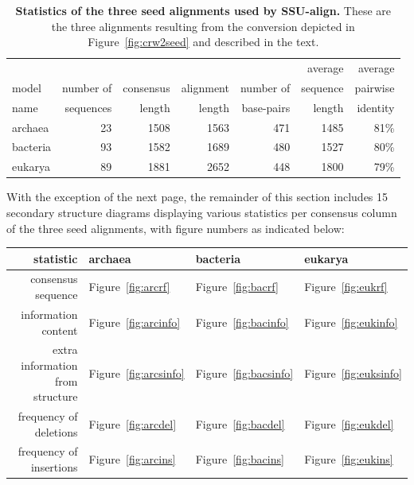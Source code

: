 \begin{table}
\begin{center}
\begin{tabular}{lrrrrrr} \hline
        &           &           &           &           & average   & average  \\
model   & number of & consensus & alignment & number of & sequence  & pairwise \\
name    & sequences & length    & length    & base-pairs & length    & identity \\ \hline
archaea & 23        & 1508      & 1563      & 471       & 1485      & 81\%     \\
bacteria& 93        & 1582      & 1689      & 480       & 1527      & 80\%     \\
eukarya  & 89       & 1881      & 2652      & 448       & 1800      & 79\%     \\ 
\end{tabular}
\caption[Statistics of the three seed alignments used by SSU-align.]
{\textbf{Statistics of the three seed alignments used by
    SSU-align.} These are the three alignments resulting from the
     conversion depicted in Figure~\ref{fig:crw2seed} and
    described in the text.}
\label{tbl:finalseeds}
\end{center}
\end{table}

With the exception of the next page, the remainder of this section
includes 15 secondary structure diagrams displaying various statistics
per consensus column of the three seed alignments, with figure numbers
as indicated below:

\vspace{0.2in}

\begin{center}
\begin{tabular}{r|l|l|l} \hline
statistic                        & archaea & bacteria & eukarya \\ \hline
consensus sequence               & Figure~\ref{fig:arcrf}  & Figure~\ref{fig:bacrf} & Figure~\ref{fig:eukrf} \\ 
information content              & Figure~\ref{fig:arcinfo} & Figure~\ref{fig:bacinfo} & Figure~\ref{fig:eukinfo} \\ 
extra information from structure & Figure~\ref{fig:arcsinfo} & Figure~\ref{fig:bacsinfo} & Figure~\ref{fig:euksinfo} \\ 
frequency of deletions           & Figure~\ref{fig:arcdel} & Figure~\ref{fig:bacdel} & Figure~\ref{fig:eukdel} \\ 
frequency of insertions          & Figure~\ref{fig:arcins} & Figure~\ref{fig:bacins} & Figure~\ref{fig:eukins} \\ 
\end{tabular}
\end{center}

